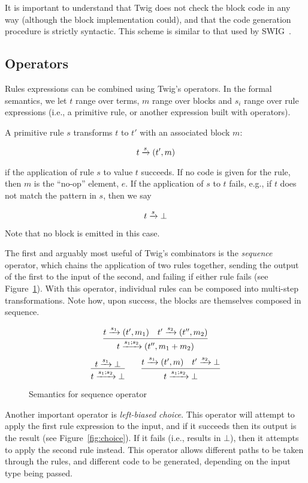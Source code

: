 It is important to understand that Twig does not check the block code in any way (although the block implementation could), and that the code generation procedure is strictly syntactic. This scheme is similar to that used by SWIG~\cite{swig}.

\subsection{Operators}
\label{sec:semantics:ops}

Rules expressions can be combined using Twig's operators. In the formal semantics, we let $t$ range over terms, $m$ range over blocks and $s_i$ range over rule expressions (i.e., a primitive rule, or another expression built with operators).

A primitive rule $s$ transforms $t$ to $t'$ with an associated  block $m$:

\[
t \xrightarrow{s} (t',m)
\]

if the application of rule $s$ to value $t$ succeeds. If no code is given for the rule, then $m$ is the ``no-op'' element, $e$. If the application of $s$ to $t$ fails, e.g., if $t$ does not match the pattern in $s$, then we say

\[
t \xrightarrow{s} \bot
\]

Note that no block is emitted in this case.

The first and arguably most useful of Twig's combinators is the \emph{sequence} operator, which chains the application of two rules together, sending the output of the first to the input of the second, and failing if either rule fails (see Figure~\ref{fig:seq}). With this operator, individual rules can be composed into multi-step transformations. Note how, upon success, the blocks are themselves composed in sequence.

\begin{figure}[ht]
\[
\infer
  {t \arr{s_1;s_2} (t'',m_1+m_2)}
  {t \arr{s_1} (t',m_1) \quad t' \arr{s_2} (t'',m_2)}
\]
\[
\infer
  {t \arr{s_1;s_2} \bot}
  {t \arr{s_1} \bot}
\qquad
\infer
  {t \arr{s_1;s_2} \bot}
  {t \arr{s_1} (t',m) \quad t' \arr{s_2} \bot}
\]
\caption{Semantics for sequence operator}
\label{fig:seq}
\end{figure}

Another important operator is \emph{left-biased choice}. This operator will attempt to apply the first rule expression to the input, and if it succeeds then its output is the result (see Figure~\ref{fig:choice}). If it fails (i.e., results in $\bot$), then it attempts to apply the second rule instead. This operator allows different paths to be taken through the rules, and different code to be generated, depending on the input type being passed.

